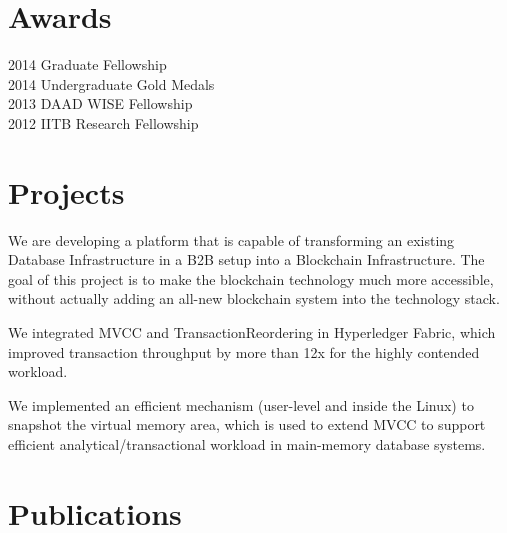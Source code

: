 \documentclass[]{deedy-resume-openfont}
\begin{document}
\begin{minipage}[t]{0.33\textwidth}
\section{Awards}
2014 \textbullet{}  Graduate Fellowship \\
2014 \textbullet{}  Undergraduate Gold Medals \\
2013 \textbullet{} DAAD WISE Fellowship \\
2012 \textbullet{} IITB Research Fellowship
\sectionsep

%
%

\end{minipage} 
\hfill
\begin{minipage}[t]{0.66\textwidth} 


\section{Projects}
We are developing a platform that is capable of transforming an existing Database Infrastructure in a B2B setup into a Blockchain Infrastructure. The goal of this project is to make the blockchain technology much more accessible, without actually adding an all-new blockchain system into the technology stack.
\sectionsep

We integrated MVCC and TransactionReordering in Hyperledger Fabric, which improved transaction throughput by more than 12x for the highly contended workload.
\sectionsep

We implemented an efficient mechanism (user-level and inside the Linux) to snapshot the virtual memory area, which is used to extend MVCC to support efficient analytical/transactional workload in main-memory database systems.


\section{Publications} 
\vspace*{0.8cm}
\renewcommand\refname{\vskip -1.5cm} %


\nocite{*}



\end{minipage}
\end{document}
